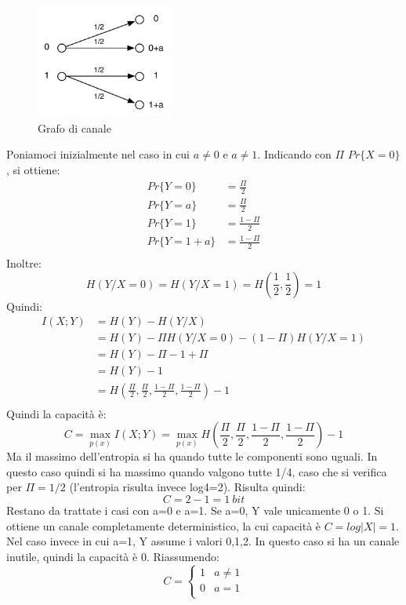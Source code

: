 \begin{enumerate}
       \begin{figure}[htbp]
       \begin{center}
	\includegraphics[width=0.4\textwidth]{img/gres.pdf}
       \caption{Grafo di canale}
       \label{fig:gres}
       \end{center}
       \end{figure}

       Poniamoci inizialmente nel caso in cui $a \neq 0$ e $a \neq 1$.
       Indicando con $\Pi$ $Pr\{X=0\}$, si ottiene:
       \[\begin{split}
        Pr\{Y=0\} &=\frac{\Pi}{2}  \\
        Pr\{Y=a\} &=\frac{\Pi}{2}  \\
        Pr\{Y=1\} &=\frac{1-\Pi}{2}  \\
        Pr\{Y=1+a\} &=\frac{1-\Pi}{2}  \\
        \end{split}
       \]
       Inoltre:
       \[
        H(Y/X=0)=H(Y/X=1)=H \left( \frac{1}{2},\frac{1}{2} \right)=1
       \]
       Quindi:
       \[\begin{split}
         I(X;Y) &=H(Y)-H(Y/X) \\
          &=H(Y)-\Pi H(Y/X=0) - (1-\Pi) H(Y/X=1) \\
          &=H(Y)-\Pi -1 + \Pi \\
          &=H(Y)-1 \\
          &=H \left (\frac{\Pi}{2},\frac{\Pi}{2},\frac{1-\Pi}{2},\frac{1-\Pi}{2} \right)-1 \\
         \end{split}
       \]
       Quindi la capacità è:
       \[
        C=\max_{p(x)} I(X;Y)
         =\max_{p(x)}H \left (\frac{\Pi}{2},\frac{\Pi}{2},\frac{1-\Pi}{2},\frac{1-\Pi}{2} \right)-1
       \]
       Ma il massimo dell'entropia si ha quando tutte le componenti sono uguali.
       In questo caso quindi si ha massimo quando valgono tutte 1/4, caso che si verifica per $\Pi=1/2$ (l'entropia 
       risulta invece log4=2).
       Risulta quindi:
       \[
        C=2-1=1 \ bit
       \]
       Restano da trattate i casi con a=0 e a=1. Se a=0, Y vale unicamente 0 o 1. Si ottiene un canale completamente 
       deterministico, la cui capacità è $C=log|X|=1$. Nel caso invece in cui a=1, Y assume i valori 0,1,2.
       In questo caso si ha un canale inutile, quindi la capacità è 0.
       Riassumendo:
       \[
        C=
        \begin{cases}
         1 & a \neq 1 \\
         0 & a =1 \\
         \end{cases}
        \]



\end{enumerate}
